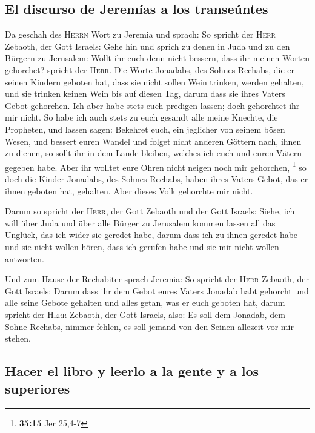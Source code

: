 \hypertarget{el-discurso-de-jeremuxedas-a-los-transeuxfantes}{%
\subsection{El discurso de Jeremías a los
transeúntes}\label{el-discurso-de-jeremuxedas-a-los-transeuxfantes}}

 Da geschah des \textsc{Herrn} Wort zu Jeremia und
sprach:  So spricht der \textsc{Herr} Zebaoth, der Gott
Israels: Gehe hin und sprich zu denen in Juda und zu den Bürgern zu
Jerusalem: Wollt ihr euch denn nicht bessern, dass ihr meinen Worten
gehorchet? spricht der \textsc{Herr}.  Die Worte
Jonadabs, des Sohnes Rechabs, die er seinen Kindern geboten hat, dass
sie nicht sollen Wein trinken, werden gehalten, und sie trinken keinen
Wein bis auf diesen Tag, darum dass sie ihres Vaters Gebot gehorchen.
Ich aber habe stets euch predigen lassen; doch gehorchtet ihr mir nicht.
 So habe ich auch stets zu euch gesandt alle meine
Knechte, die Propheten, und lassen sagen: Bekehret euch, ein jeglicher
von seinem bösen Wesen, und bessert euren Wandel und folget nicht
anderen Göttern nach, ihnen zu dienen, so sollt ihr in dem Lande
bleiben, welches ich euch und euren Vätern gegeben habe. Aber ihr
wolltet eure Ohren nicht neigen noch mir gehorchen, \footnote{\textbf{35:15}
  Jer 25,4-7}  so doch die Kinder Jonadabs, des Sohnes
Rechabs, haben ihres Vaters Gebot, das er ihnen geboten hat, gehalten.
Aber dieses Volk gehorchte mir nicht.

 Darum so spricht der \textsc{Herr}, der Gott Zebaoth und
der Gott Israels: Siehe, ich will über Juda und über alle Bürger zu
Jerusalem kommen lassen all das Unglück, das ich wider sie geredet habe,
darum dass ich zu ihnen geredet habe und sie nicht wollen hören, dass
ich gerufen habe und sie mir nicht wollen antworten.

 Und zum Hause der Rechabiter sprach Jeremia: So spricht
der \textsc{Herr} Zebaoth, der Gott Israels: Darum dass ihr dem Gebot
eures Vaters Jonadab habt gehorcht und alle seine Gebote gehalten und
alles getan, was er euch geboten hat,  darum spricht der
\textsc{Herr} Zebaoth, der Gott Israels, also: Es soll dem Jonadab, dem
Sohne Rechabs, nimmer fehlen, es soll jemand von den Seinen allezeit vor
mir stehen.

\hypertarget{hacer-el-libro-y-leerlo-a-la-gente-y-a-los-superiores}{%
\subsection{Hacer el libro y leerlo a la gente y a los
superiores}\label{hacer-el-libro-y-leerlo-a-la-gente-y-a-los-superiores}}

